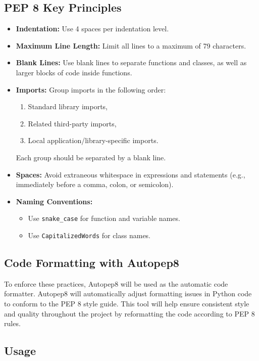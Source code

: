 \documentclass{article}
\begin{document}
\subsection*{PEP 8 Key Principles}

\begin{itemize}
    \item \textbf{Indentation:} Use 4 spaces per indentation level.
    \item \textbf{Maximum Line Length:} Limit all lines to a maximum of 79 characters.
    \item \textbf{Blank Lines:} Use blank lines to separate functions and classes, as well as larger blocks of code inside functions.
    \item \textbf{Imports:} Group imports in the following order:
    \begin{enumerate}
        \item Standard library imports,
        \item Related third-party imports,
        \item Local application/library-specific imports.
    \end{enumerate}
    Each group should be separated by a blank line.
    \item \textbf{Spaces:} Avoid extraneous whitespace in expressions and statements (e.g., immediately before a comma, colon, or semicolon).
    \item \textbf{Naming Conventions:}
    \begin{itemize}
        \item Use \texttt{snake\_case} for function and variable names.
        \item Use \texttt{CapitalizedWords} for class names.
    \end{itemize}
\end{itemize}

\subsection*{Code Formatting with Autopep8}

To enforce these practices, Autopep8 will be used as the automatic code formatter. Autopep8 will automatically adjust formatting issues in Python code to conform to the PEP 8 style guide. This tool will help ensure consistent style and quality throughout the project by reformatting the code according to PEP 8 rules.

\subsection*{Usage}
\end{document}
